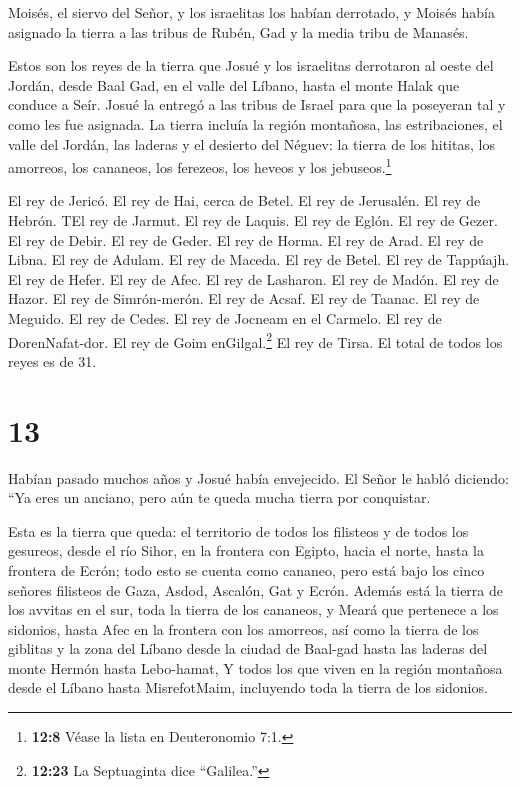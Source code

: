  Moisés, el siervo del Señor, y los israelitas los habían
derrotado, y Moisés había asignado la tierra a las tribus de Rubén, Gad
y la media tribu de Manasés.

 Estos son los reyes de la tierra que Josué y los israelitas
derrotaron al oeste del Jordán, desde Baal Gad, en el valle del Líbano,
hasta el monte Halak que conduce a Seír. Josué la entregó a las tribus
de Israel para que la poseyeran tal y como les fue asignada.
 La tierra incluía la región montañosa, las estribaciones,
el valle del Jordán, las laderas y el desierto del Néguev: la tierra de
los hititas, los amorreos, los cananeos, los ferezeos, los heveos y los
jebuseos.\footnote{\textbf{12:8} Véase la lista en Deuteronomio 7:1.}

 El rey de Jericó. El rey de Hai, cerca de Betel.
 El rey de Jerusalén. El rey de Hebrón.  TEl
rey de Jarmut. El rey de Laquis.  El rey de Eglón. El rey
de Gezer.  El rey de Debir. El rey de Geder. 
El rey de Horma. El rey de Arad.  El rey de Libna. El rey
de Adulam.  El rey de Maceda. El rey de Betel.
 El rey de Tappúajh. El rey de Hefer.  El rey
de Afec. El rey de Lasharon.  El rey de Madón. El rey de
Hazor.  El rey de Simrón-merón. El rey de Acsaf.
 El rey de Taanac. El rey de Meguido.  El rey
de Cedes. El rey de Jocneam en el Carmelo.  El rey de
DorenNafat-dor. El rey de Goim enGilgal.\footnote{\textbf{12:23} La
  Septuaginta dice ``Galilea.''}  El rey de Tirsa. El total
de todos los reyes es de 31.

\hypertarget{section-12}{%
\section{13}\label{section-12}}

 Habían pasado muchos años y Josué había envejecido. El
Señor le habló diciendo: ``Ya eres un anciano, pero aún te queda mucha
tierra por conquistar.

 Esta es la tierra que queda: el territorio de todos los
filisteos y de todos los gesureos,  desde el río Sihor, en
la frontera con Egipto, hacia el norte, hasta la frontera de Ecrón; todo
esto se cuenta como cananeo, pero está bajo los cinco señores filisteos
de Gaza, Asdod, Ascalón, Gat y Ecrón. Además está la tierra de los
avvitas  en el sur, toda la tierra de los cananeos, y Meará
que pertenece a los sidonios, hasta Afec en la frontera con los
amorreos,  así como la tierra de los giblitas y la zona del
Líbano desde la ciudad de Baal-gad hasta las laderas del monte Hermón
hasta Lebo-hamat,  Y todos los que viven en la región
montañosa desde el Líbano hasta MisrefotMaim, incluyendo toda la tierra
de los sidonios.

